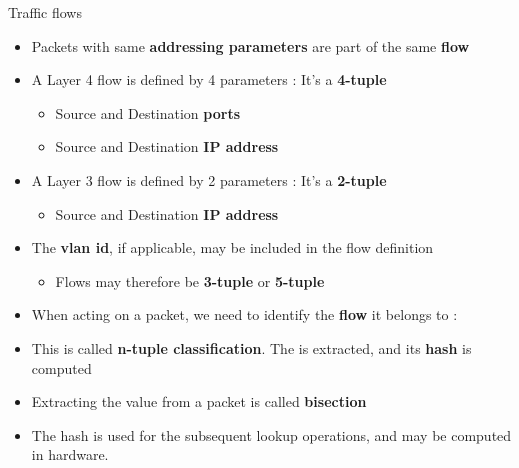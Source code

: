 \begin{frame}{Traffic flows}
	\begin{itemize}
		\item Packets with same \textbf{addressing parameters} are part of the same \textbf{flow}
		\item A Layer 4 flow is defined by 4 parameters : It's a \textbf{4-tuple}
			\begin{itemize}
				\item Source and Destination \textbf{ports}
				\item Source and Destination \textbf{IP address}
			\end{itemize}
		\item A Layer 3 flow is defined by 2 parameters : It's a \textbf{2-tuple}
			\begin{itemize}
				\item Source and Destination \textbf{IP address}
			\end{itemize}
		\item The \textbf{vlan id}, if applicable, may be included in the flow definition
			\begin{itemize}
				\item Flows may therefore be \textbf{3-tuple} or \textbf{5-tuple}
			\end{itemize}
		\item When acting on a packet, we need to identify the \textbf{flow} it belongs to :
		\item This is called \textbf{n-tuple classification}. The  is extracted, and its \textbf{hash} is computed
		\item Extracting the  value from a packet is called \textbf{bisection}
		\item The hash is used for the subsequent lookup operations, and may be computed in hardware.
	\end{itemize}
\end{frame}

